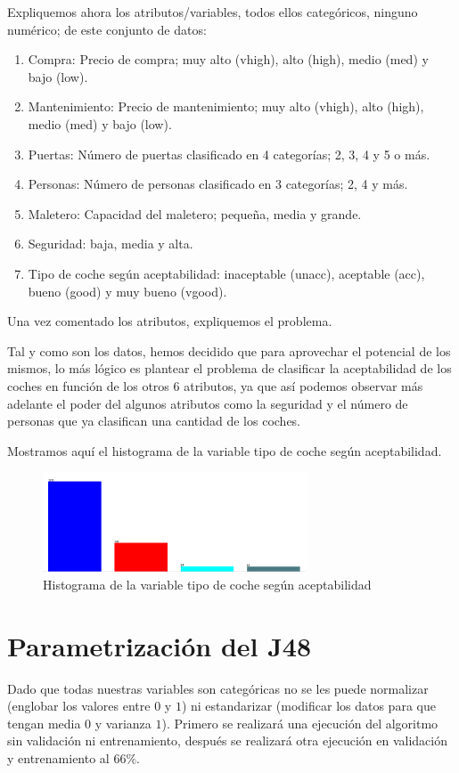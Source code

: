 \documentclass[a4paper, 11pt, twoside, openany, onecolumn, final]{memoir}
\begin{document}
		Expliquemos ahora los atributos/variables, todos ellos categóricos, ninguno numérico; de este conjunto de datos:
	
	\begin{enumerate}
\item Compra: Precio de compra; muy alto (vhigh), alto (high), medio (med) y bajo (low).
\item Mantenimiento: Precio de mantenimiento; muy alto (vhigh), alto (high), medio (med) y bajo (low).
\item Puertas: Número de puertas clasificado en 4 categorías; 2, 3, 4 y 5 o más.
\item Personas: Número de personas clasificado en 3 categorías; 2, 4 y más.
\item Maletero: Capacidad del maletero; pequeña, media y grande.
\item Seguridad: baja, media y alta. 
\item Tipo de coche según aceptabilidad: inaceptable (unacc), aceptable (acc), bueno (good) y muy bueno (vgood). 
\end{enumerate}
		
		Una vez comentado los atributos, expliquemos el problema. 

Tal y como son los datos, hemos decidido que para aprovechar el potencial de los mismos, lo más lógico es plantear el problema de clasificar la aceptabilidad de los coches en función de los otros 6 atributos, ya que así podemos observar más adelante el poder del algunos atributos como la seguridad y el número de personas que ya clasifican una cantidad de los coches.

Mostramos aquí el histograma de la variable tipo de coche según aceptabilidad. 
	\begin{figure}
  		\centering
   		\includegraphics[width=0.7\textwidth]{Imagenes/HistogramaVarSalidaClasif}
  		\caption{Histograma de la variable tipo de coche según aceptabilidad}
  		\label{HistoVarSalidaClasi}
	\end{figure}
	\section{Parametrización del J48}
		Dado que todas nuestras variables son categóricas no se les puede normalizar (englobar los valores entre $0$ y $1$) ni estandarizar (modificar los datos para que tengan media $0$ y varianza $1$). 
		Primero se realizará una ejecución del algoritmo sin validación ni entrenamiento, después se realizará otra ejecución en validación y entrenamiento al $66\%$.
		
\end{document}
